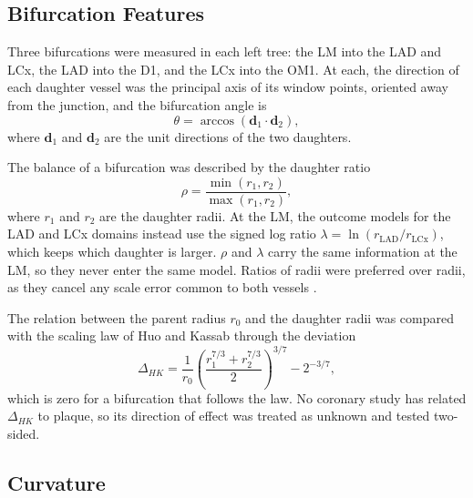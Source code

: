 \subsection{Bifurcation Features}

Three bifurcations were measured in each left tree: the LM into the LAD and LCx, the LAD into the
D1, and the LCx into the OM1.
At each, the direction of each daughter vessel was the principal axis of its window points,
oriented away from the junction, and the bifurcation angle is
\begin{equation}
  \theta = \arccos\left(\mathbf{d}_1 \cdot \mathbf{d}_2\right),
  \label{eq:method-angle}
\end{equation}
where $\mathbf{d}_1$ and $\mathbf{d}_2$ are the unit directions of the two daughters.

The balance of a bifurcation was described by the daughter ratio
\begin{equation}
  \rho = \frac{\min(r_1, r_2)}{\max(r_1, r_2)},
  \label{eq:method-rho}
\end{equation}
where $r_1$ and $r_2$ are the daughter radii.
At the LM, the outcome models for the LAD and LCx domains instead use the signed log ratio
$\lambda = \ln(r_\mathrm{LAD}/r_\mathrm{LCx})$, which keeps which daughter is larger.
$\rho$ and $\lambda$ carry the same information at the LM, so they never enter the same model.
Ratios of radii were preferred over radii, as they cancel any scale error common to both vessels
\cite{finet2008fractal}.

The relation between the parent radius $r_0$ and the daughter radii was compared with the scaling
law of Huo and Kassab \cite{huo2012scaling} through the deviation
\begin{equation}
  \Delta_{HK} = \frac{1}{r_0}\left(\frac{r_1^{7/3} + r_2^{7/3}}{2}\right)^{3/7} - 2^{-3/7},
  \label{eq:method-hk}
\end{equation}
which is zero for a bifurcation that follows the law.
No coronary study has related $\Delta_{HK}$ to plaque, so its direction of effect was treated as
unknown and tested two-sided.

\subsection{Curvature}

